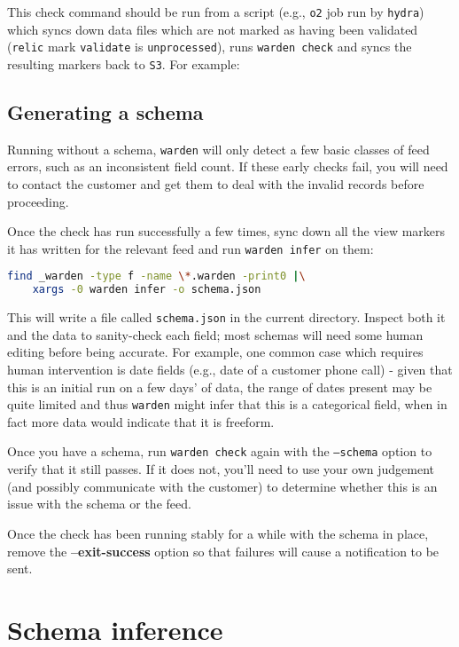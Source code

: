 \documentclass[a4paper]{article}
\begin{document}
This check command should be run from a script (e.g., \texttt{o2} job
run by \texttt{hydra}) which syncs down data files which are not
marked as having been validated (\texttt{relic} mark \texttt{validate}
is \texttt{unprocessed}), runs \texttt{warden check} and syncs the
resulting markers back to \texttt{S3}. For example:



\subsection{Generating a schema}

Running without a schema, \texttt{warden} will only detect a few
basic classes of feed errors, such as an inconsistent field count. If
these early checks fail, you will need to contact the customer and get
them to deal with the invalid records before proceeding.

Once the check has run successfully a few times, sync down all the
view markers it has written for the relevant feed and run
\texttt{warden infer} on them:

\begin{lstlisting}[language=bash]
find _warden -type f -name \*.warden -print0 |\
    xargs -0 warden infer -o schema.json
\end{lstlisting}

This will write a file called \texttt{schema.json} in the current
directory. Inspect both it and the data to sanity-check each field;
most schemas will need some human editing before being accurate. For
example, one common case which requires human intervention is date
fields (e.g., date of a customer phone call) - given that this is an
initial run on a few days' of data, the range of dates present may be
quite limited and thus \texttt{warden} might infer that this is a
categorical field, when in fact more data would indicate that it is
freeform.

Once you have a schema, run \texttt{warden check} again with the
\texttt{--schema} option to verify that it still passes. If it does
not, you'll need to use your own judgement (and possibly communicate
with the customer) to determine whether this is an issue with the
schema or the feed.

Once the check has been running stably for a while with the schema in
place, remove the \textbf{--exit-success} option so that failures will
cause a notification to be sent.

\section{Schema inference}\label{schema-inference}
\end{document}
